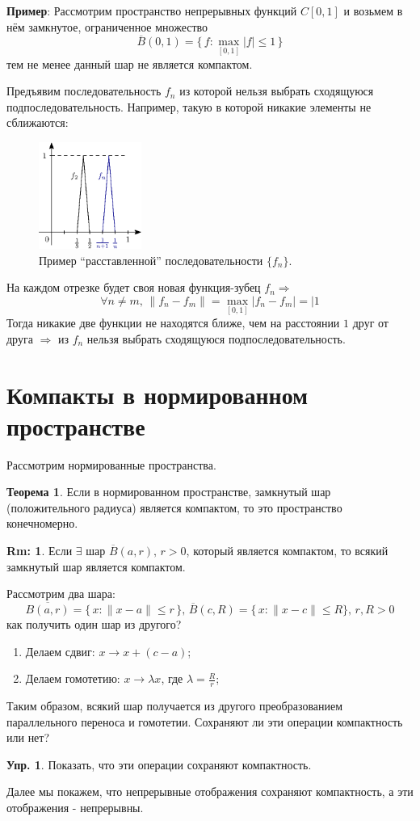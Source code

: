\documentclass[12pt]{article}
\theoremstyle{definition}
\newtheorem{rem}{Rm:}
\newtheorem{exrc}{Упр.}
\newtheorem{theorem}{Теорема}
\begin{document}
\textbf{Пример}: Рассмотрим пространство непрерывных функций $C[0,1]$ и возьмем в нём замкнутое, ограниченное множество 
$$
	\overline{B}(0,1) = \Big\{\,f \colon \max\limits_{[0,1]}|f| \leq 1 \,\Big\}
$$ 
тем не менее данный шар не является компактом.

Предъявим последовательность $f_n$ из которой нельзя выбрать сходящуюся подпоследовательность. Например, такую в которой никакие элементы не сближаются:
\begin{figure}[H]
	\centering
	\includegraphics[width=0.3\textwidth]{8_8.eps}
	\caption{Пример ``расставленной'' последовательности $\{f_n\}$.}
	\label{8_8}
\end{figure}
На каждом отрезке будет своя новая функция-зубец $f_n \Rightarrow$ 
$$
	\forall n \neq m, \, \|f_n - f_m\| = \max\limits_{[0,1]}|f_n -f_m| = |1
$$
Тогда никакие две функции не находятся ближе, чем на расстоянии $1$ друг от друга $\Rightarrow$ из $f_n$ нельзя выбрать сходящуюся подпоследовательность.

\newpage
\section*{Компакты в нормированном пространстве}
Рассмотрим нормированные пространства.
\begin{theorem}
	Если в нормированном пространстве, замкнутый шар (положительного радиуса) является компактом, то это пространство конечномерно.
\end{theorem}

\begin{rem}
	Если $\exists$ шар $\overline{B}(a,r), \, r > 0$, который является компактом, то всякий замкнутый шар является компактом.
\end{rem}

Рассмотрим два шара:
$$
	\overline{B(a,r)} = \{\, x \colon \|x - a\| \leq r \,\}, \, \overline{B}(c,R) = \{\, x \colon  \|x - c\| \leq R\}, \, r,R > 0
$$
как получить один шар из другого? 
\begin{enumerate}[label ={(\arabic*)}]
	\item Делаем сдвиг: $x \to x + (c-a)$;
	\item Делаем гомотетию: $x \to \lambda x$, где $ \lambda = \frac{R}{r}$;
\end{enumerate}
Таким образом, всякий шар получается из другого преобразованием параллельного переноса и гомотетии. Сохраняют ли эти операции компактность или нет?

\begin{exrc}
	Показать, что эти операции сохраняют компактность.
\end{exrc}

Далее мы покажем, что непрерывные отображения сохраняют компактность, а эти отображения - непрерывны.
\end{document}
